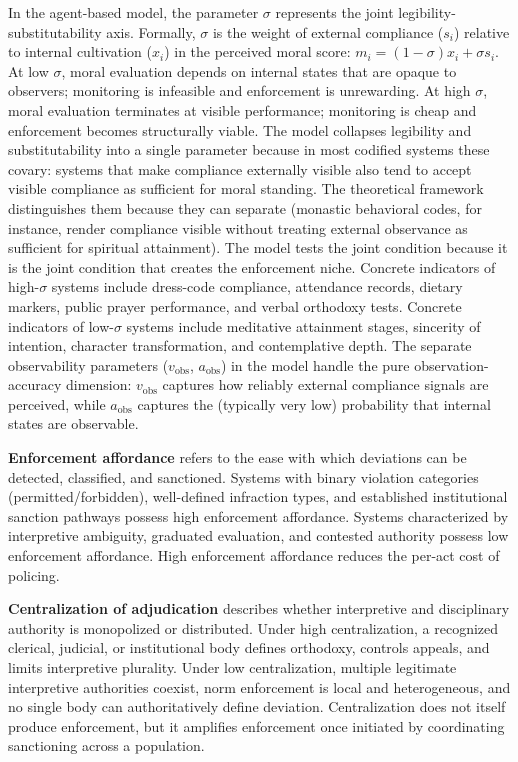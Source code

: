 \documentclass[12pt]{article}
\begin{document}
In the agent-based model, the parameter $\sigma$ represents the joint legibility-substitutability axis. Formally, $\sigma$ is the weight of external compliance ($s_i$) relative to internal cultivation ($x_i$) in the perceived moral score: $m_i = (1 - \sigma)x_i + \sigma s_i$. At low $\sigma$, moral evaluation depends on internal states that are opaque to observers; monitoring is infeasible and enforcement is unrewarding. At high $\sigma$, moral evaluation terminates at visible performance; monitoring is cheap and enforcement becomes structurally viable. The model collapses legibility and substitutability into a single parameter because in most codified systems these covary: systems that make compliance externally visible also tend to accept visible compliance as sufficient for moral standing. The theoretical framework distinguishes them because they can separate (monastic behavioral codes, for instance, render compliance visible without treating external observance as sufficient for spiritual attainment). The model tests the joint condition because it is the joint condition that creates the enforcement niche. Concrete indicators of high-$\sigma$ systems include dress-code compliance, attendance records, dietary markers, public prayer performance, and verbal orthodoxy tests. Concrete indicators of low-$\sigma$ systems include meditative attainment stages, sincerity of intention, character transformation, and contemplative depth. The separate observability parameters ($v_{\text{obs}}$, $a_{\text{obs}}$) in the model handle the pure observation-accuracy dimension: $v_{\text{obs}}$ captures how reliably external compliance signals are perceived, while $a_{\text{obs}}$ captures the (typically very low) probability that internal states are observable.

\textbf{Enforcement affordance} refers to the ease with which deviations can be detected, classified, and sanctioned. Systems with binary violation categories (permitted/forbidden), well-defined infraction types, and established institutional sanction pathways possess high enforcement affordance. Systems characterized by interpretive ambiguity, graduated evaluation, and contested authority possess low enforcement affordance. High enforcement affordance reduces the per-act cost of policing.

\textbf{Centralization of adjudication} describes whether interpretive and disciplinary authority is monopolized or distributed. Under high centralization, a recognized clerical, judicial, or institutional body defines orthodoxy, controls appeals, and limits interpretive plurality. Under low centralization, multiple legitimate interpretive authorities coexist, norm enforcement is local and heterogeneous, and no single body can authoritatively define deviation. Centralization does not itself produce enforcement, but it amplifies enforcement once initiated by coordinating sanctioning across a population.
\end{document}
